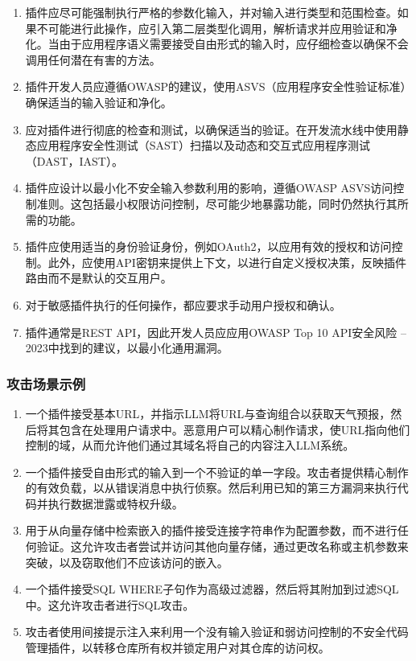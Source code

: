 \documentclass[
]{article}
\providecommand{\tightlist}{%
  \setlength{\itemsep}{0pt}\setlength{\parskip}{0pt}}
\begin{document}
\begin{enumerate}
\def\labelenumi{\arabic{enumi}.}
\tightlist
\item
  插件应尽可能强制执行严格的参数化输入，并对输入进行类型和范围检查。如果不可能进行此操作，应引入第二层类型化调用，解析请求并应用验证和净化。当由于应用程序语义需要接受自由形式的输入时，应仔细检查以确保不会调用任何潜在有害的方法。
\item
  插件开发人员应遵循OWASP的建议，使用ASVS（应用程序安全性验证标准）确保适当的输入验证和净化。
\item
  应对插件进行彻底的检查和测试，以确保适当的验证。在开发流水线中使用静态应用程序安全性测试（SAST）扫描以及动态和交互式应用程序测试（DAST，IAST）。
\item
  插件应设计以最小化不安全输入参数利用的影响，遵循OWASP
  ASVS访问控制准则。这包括最小权限访问控制，尽可能少地暴露功能，同时仍然执行其所需的功能。
\item
  插件应使用适当的身份验证身份，例如OAuth2，以应用有效的授权和访问控制。此外，应使用API密钥来提供上下文，以进行自定义授权决策，反映插件路由而不是默认的交互用户。
\item
  对于敏感插件执行的任何操作，都应要求手动用户授权和确认。
\item
  插件通常是REST API，因此开发人员应应用OWASP Top 10 API安全风险 --
  2023中找到的建议，以最小化通用漏洞。
\end{enumerate}

\subsubsection{攻击场景示例}\label{ux653bux51fbux573aux666fux793aux4f8b}

\begin{enumerate}
\def\labelenumi{\arabic{enumi}.}
\tightlist
\item
  一个插件接受基本URL，并指示LLM将URL与查询组合以获取天气预报，然后将其包含在处理用户请求中。恶意用户可以精心制作请求，使URL指向他们控制的域，从而允许他们通过其域名将自己的内容注入LLM系统。
\item
  一个插件接受自由形式的输入到一个不验证的单一字段。攻击者提供精心制作的有效负载，以从错误消息中执行侦察。然后利用已知的第三方漏洞来执行代码并执行数据泄露或特权升级。
\item
  用于从向量存储中检索嵌入的插件接受连接字符串作为配置参数，而不进行任何验证。这允许攻击者尝试并访问其他向量存储，通过更改名称或主机参数来突破，以及窃取他们不应该访问的嵌入。
\item
  一个插件接受SQL
  WHERE子句作为高级过滤器，然后将其附加到过滤SQL中。这允许攻击者进行SQL攻击。
\item
  攻击者使用间接提示注入来利用一个没有输入验证和弱访问控制的不安全代码管理插件，以转移仓库所有权并锁定用户对其仓库的访问权。
\end{enumerate}
\end{document}
